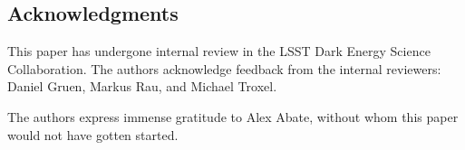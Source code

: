 \documentclass[\docopts]{\docclass}
\begin{document}











\subsection*{Acknowledgments}


This paper has undergone internal review in the LSST Dark Energy Science Collaboration.
The authors acknowledge feedback from the internal reviewers: Daniel Gruen, Markus Rau, and Michael Troxel. %




The authors express immense gratitude to Alex Abate, without whom this paper would not have gotten started.
\end{document}
